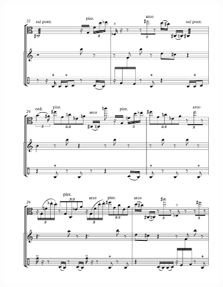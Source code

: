 \begin{figure}[htbp]
    \centering
	\includegraphics[width=6.5in]{figures/Viola_Percussion_4.pdf}
\end{figure}

